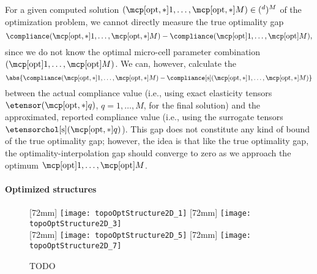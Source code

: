 For a given computed solution
$(\mcpoptappr{1}, \dotsc, \mcpoptappr{M}) \in (\real^d)^M$
of the optimization problem,
we cannot directly measure the true optimality gap
\begin{equation}
  \label{eq:topoOptOptimalityGapTrue}
  \compliance(\mcpoptappr{1}, \dotsc, \mcpoptappr{M}) -
  \compliance(\mcpopt{1}, \dotsc, \mcpopt{M}),
\end{equation}
since we do not know the optimal micro-cell parameter combination
$(\mcpopt{1}, \dotsc, \mcpopt{M})$.
We can, however, calculate the 
\begin{equation}
  \label{eq:topoOptOptimalityGapPseudo}
  \abs{
    \compliance(\mcpoptappr{1}, \dotsc, \mcpoptappr{M}) -
    \complianceintp(\mcpoptappr{1}, \dotsc, \mcpoptappr{M})
  }
\end{equation}
between the actual compliance value
(i.e., using exact elasticity tensors $\etensor(\mcpoptappr{q})$,
$q = 1, \dotsc, M$, for the final solution) and
the approximated, reported compliance value
(i.e., using the surrogate tensors $\etensorcholintp(\mcpoptappr{q})$).
This gap does not constitute any kind of bound of the true optimality gap;
however, the idea is that like the true optimality gap,
the optimality-interpolation gap should converge to zero as
we approach the optimum $\mcpopt{1}, \dotsc, \mcpopt{M}$.

\dummytext[3]{}

\paragraph{Optimized structures}


\dummytext[1]{}

\begin{figure}
  [72mm]{%
    \texttt{[image: topoOptStructure2D\_1]}%
  }%
  \hfill%
  [72mm]{%
    \texttt{[image: topoOptStructure2D\_3]}%
  }%
  \\[2mm]%
  [72mm]{%
    \texttt{[image: topoOptStructure2D\_5]}%
  }%
  \hfill%
  [72mm]{%
    \texttt{[image: topoOptStructure2D\_7]}%
  }%
  \caption[TODO]{%
    TODO%
  }%
  \label{fig:topoOptStructure2DCantilever}%
\end{figure}
